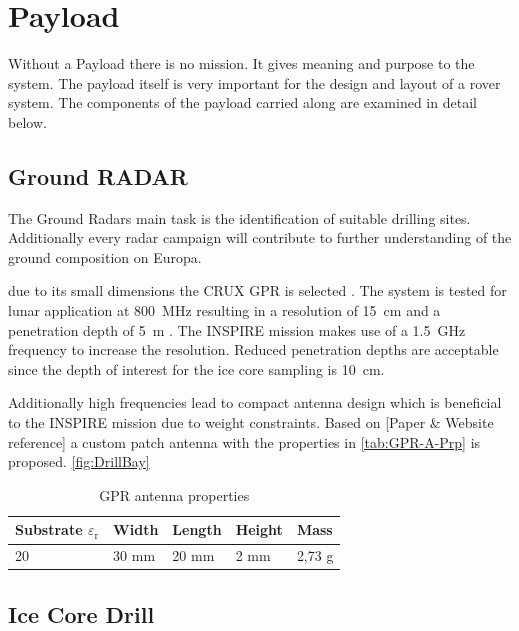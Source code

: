 
\chapter{Payload}
\label{chap:payload}

Without a Payload there is no mission. It gives meaning and purpose to the system. The payload itself is very important for the design and layout of a rover system. The components of the payload carried along are examined in detail below. 

\section{Ground RADAR}
The Ground Radars main task is the identification of suitable drilling sites. Additionally every radar campaign will contribute to further understanding of the ground composition on Europa.

due to its small dimensions the CRUX GPR is selected . The system is tested for lunar application at 800~MHz resulting in a resolution of 15~cm and a penetration depth of 5~m \cite{CRUX_GPR}. The INSPIRE mission makes use of a 1.5~GHz frequency to increase the resolution. 
Reduced penetration depths are acceptable since the depth of interest for the ice core sampling is 10~cm.

Additionally high frequencies lead to compact antenna design which is beneficial to the INSPIRE mission due to weight constraints. 
Based on [Paper \& Website reference] a custom patch antenna with the properties in \autoref{tab:GPR-A-Prp} is proposed. \autoref{fig:DrillBay}

\begin{table}[h]
\centering
\begin{tabular}{lllll}
\toprule
Substrate ${\varepsilon}_\text{r}$ & Width & Length & Height & Mass   \\
\midrule
20                         & 30 mm & 20 mm  & 2 mm   & 2,73 g  \\
\bottomrule
\end{tabular}
\caption{GPR antenna properties}
\label{tab:GPR-A-Prp}
\end{table}

\section{Ice Core Drill}

